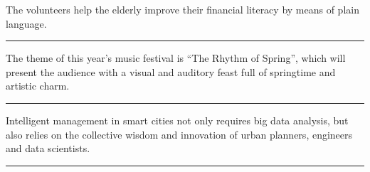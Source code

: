 \documentclass[11pt,a4paper]{article}
\newcommand{\num}[1]{\makebox[1.9em][r]{#1.}\hspace{0.3em}}
\newcommand{\wline}{\noindent\rule{\linewidth}{0.4pt}}
\begin{document}
\begin{minipage}{\linewidth}

\num{14}The volunteers help the elderly improve their financial literacy by means of plain language.

\vspace{0.25em}

\wline

\end{minipage}

\begin{minipage}{\linewidth}

\num{15}The theme of this year’s music festival is “The Rhythm of Spring”, which will present the audience with a visual and auditory feast full of springtime and artistic charm.

\vspace{0.25em}

\wline

\end{minipage}

\begin{minipage}{\linewidth}

\num{16}Intelligent management in smart cities not only requires big data analysis, but also relies on the collective wisdom and innovation of urban planners, engineers and data scientists.

\vspace{0.25em}

\wline

\end{minipage}
\end{document}
